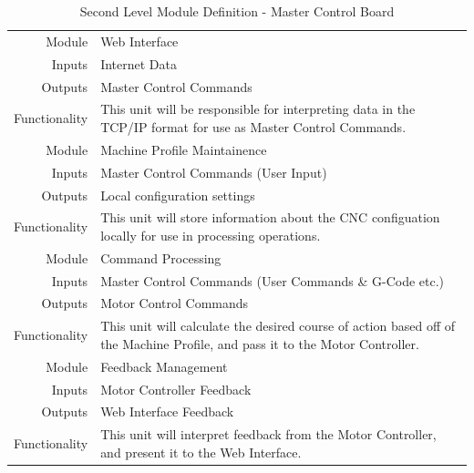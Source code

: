 \begin{table}[ht] 
	\caption{Second Level Module Definition - Master Control Board}
	\label{table:secondlevelmaster}
	\centering 
	\begin{tabular}{|r p{10cm}|} 
		\hline\hline 
		Module		& Web Interface \\ 
		Inputs		& Internet Data	\\ 
		Outputs		& Master Control Commands \\ 
		Functionality	& This unit will be responsible for interpreting data in the TCP/IP format for use as Master Control Commands.\\ 
		\hline\hline 
		Module		& Machine Profile Maintainence \\ 
		Inputs		& Master Control Commands (User Input)\\ 
		Outputs		& Local configuration settings \\ 
		Functionality	& This unit will store information about the CNC configuation locally for use in processing operations.\\
		\hline\hline  
		Module		& Command Processing \\ 
		Inputs		& Master Control Commands (User Commands \& G-Code etc.) \\ 
		Outputs		& Motor Control Commands \\ 
		Functionality	& This unit will calculate the desired course of action based off of the Machine Profile, and pass it to the Motor Controller.\\
		\hline\hline 
		Module		& Feedback Management \\ 
		Inputs		& Motor Controller Feedback \\ 
		Outputs		& Web Interface Feedback \\ 
		Functionality	& This unit will interpret feedback from the Motor Controller, and present it to the Web Interface. \\
		\hline
		\end{tabular} 
\end{table}

